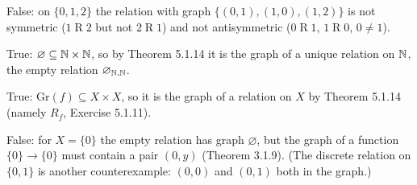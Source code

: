  False: on $\{0,1,2\}$ the relation with graph $\{(0,1),(1,0),(1,2)\}$ is not symmetric ($1\mathrel R2$ but not $2\mathrel R1$) and not antisymmetric ($0\mathrel R1$, $1\mathrel R0$, $0\ne1$).

 True: $\varnothing\subseteq\mathbb{N}\times\mathbb{N}$, so by Theorem 5.1.14 it is the graph of a unique relation on $\mathbb{N}$, the empty relation $\varnothing_{\mathbb{N},\mathbb{N}}$.

 True: $\mathrm{Gr}(f)\subseteq X\times X$, so it is the graph of a relation on $X$ by Theorem 5.1.14 (namely $R_f$, Exercise 5.1.11).

 False: for $X=\{0\}$ the empty relation has graph $\varnothing$, but the graph of a function $\{0\}\to\{0\}$ must contain a pair $(0,y)$ (Theorem 3.1.9). (The discrete relation on $\{0,1\}$ is another counterexample: $(0,0)$ and $(0,1)$ both in the graph.)
